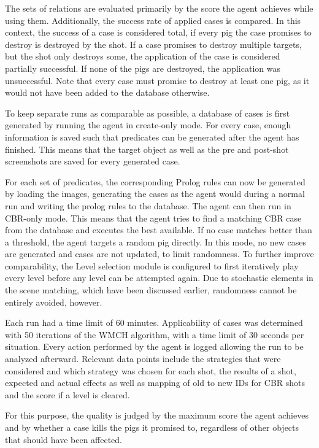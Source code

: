 The sets of relations are evaluated primarily by the score the agent achieves while using them. Additionally, the success rate of applied cases is compared.
In this context, the success of a case is considered total, if every pig the case promises to destroy is destroyed by the shot. 
If a case promises to destroy multiple targets, but the shot only destroys some, the application of the case is considered partially successful. 
If none of the pigs are destroyed, the application was unsuccessful.
Note that every case must promise to destroy at least one pig, as it would not have been added to the database otherwise.

To keep separate runs as comparable as possible, a database of cases is first generated by running the agent in create-only mode.
For every case, enough information is saved such that predicates can be generated after the agent has finished. This means that the target object as well as the pre and post-shot screenshots are saved for every generated case.

For each set of predicates, the corresponding Prolog rules can now be generated by loading the images, generating the cases as the agent would during a normal run and writing the prolog rules to the database. The agent can then run in CBR-only mode.
This means that the agent tries to find a matching CBR case from the database and executes the best available. If no case matches better than a threshold, the agent targets a random pig directly. In this mode, no new cases are generated and cases are not updated, to limit randomness.
To further improve comparability, the Level selection module is configured to first iteratively play every level before any level can be attempted again.
Due to stochastic elements in the scene matching, which have been discussed earlier, randomness cannot be entirely avoided, however.

Each run had a time limit of 60 minutes.
Applicability of cases was determined with 50 iterations of the \ac{WMCH} algorithm, with a time limit of 30 seconds per situation. Every action performed by the agent is logged allowing the run to be analyzed afterward.
Relevant data points include the strategies that were considered and which strategy was chosen for each shot, the results of a shot, expected and actual effects as well as mapping of old to new IDs for CBR shots and the score if a level is cleared.

For this purpose, the quality is judged by the maximum score the agent achieves and by whether a case kills the pigs it promised to, regardless of other objects that should have been affected.

